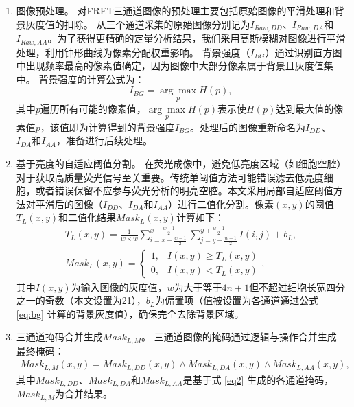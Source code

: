 \begin{enumerate}
\item {图像预处理。}
对FRET三通道图像的预处理主要包括原始图像的平滑处理和背景灰度值的扣除。
从三个通道采集的原始图像分别记为$I_{Raw,DD}$、$I_{Raw,DA}$和$I_{Raw,AA}$。为了获得更精确的定量分析结果，我们采用高斯模糊对图像进行平滑处理，利用钟形曲线为像素分配权重影响。  
背景强度（$I_{BG}$）通过识别直方图中出现频率最高的像素值确定，因为图像中大部分像素属于背景且灰度值集中。
背景强度的计算公式为：
\begin{equation}
    I_{BG} = \underset{p}{\arg\max} H(p), 
    \label{eq:bg}
\end{equation}
其中$p$遍历所有可能的像素值，$\underset{p}{\arg\max} H(p)$表示使$H(p)$达到最大值的像素值$p$，该值即为计算得到的背景强度$I_{BG}$。处理后的图像重新命名为$I_{DD}$、$I_{DA}$和$I_{AA}$，准备进行后续处理。

\item {基于亮度的自适应阈值分割。}  
在荧光成像中，避免低亮度区域（如细胞空腔）对于获取高质量荧光信号至关重要。传统单阈值方法可能错误滤去低亮度细胞，或者错误保留不应参与荧光分析的明亮空腔。本文采用局部自适应阈值方法对平滑后的图像（$I_{DD}$、$I_{DA}$和$I_{AA}$）进行二值化分割。像素$(x, y)$的阈值$T_L(x,y)$和二值化结果${Mask}_L(x,y)$计算如下：
\begin{align}
    T_L(x,y)=\frac{1}{w \times w} \sum_{i=x-\frac{w-1}{2}}^{x+\frac{w-1}{2}} \sum_{j=y-\frac{w-1}{2}}^{y+\frac{w-1}{2}} I(i,j)+b_L,
    \label{eq1} \\
    {Mask}_L(x,y)=\begin{cases}
        1,&I(x,y) \geq T_L(x,y) \\
        0,&I(x,y) < T_L(x,y)
    \end{cases},
    \label{eq2}
\end{align}
其中$I(x,y)$为输入图像的灰度值，$w$为大于等于$4n+1$但不超过细胞长宽四分之一的奇数（本文设置为21），$b_L$为偏置项（值被设置为各通道通过公式 \ref{eq:bg} 计算的背景灰度值），确保完全去除背景区域。

\item {三通道掩码合并生成${Mask}_{L, M}$。}  
三通道图像的掩码通过逻辑与操作合并生成最终掩码：
\begin{equation}
    \begin{split}
    {Mask}_{L, M}(x,y)={Mask}_{L, DD}(x,y) \land {Mask}_{L, DA}(x,y) \land {Mask}_{L, AA}(x,y),
    \end{split}
    \label{eq3}
\end{equation}
其中${Mask}_{L, DD}$、${Mask}_{L, DA}$和${Mask}_{L, AA}$是基于式 \ref{eq2} 生成的各通道掩码，${Mask}_{L, M}$为合并结果。


\end{enumerate}
